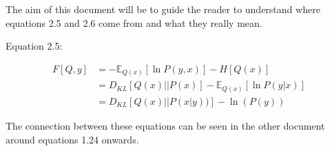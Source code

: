 \documentclass[11pt,oneside]{memoir}
\begin{document}
The aim of this document will be to guide the reader to understand where equations 2.5 and 2.6 come from and what they really mean.

Equation 2.5:

\begin{align}
    F[Q,y]&=-\mathbb{E}_{Q(x)}\left[\ln P(y,x)\right]-H[Q(x)]\\&=D_{KL}[Q(x)||P(x)]-\mathbb{E}_{Q(x)}[\ln P(y|x)]\\&=D_{KL}[Q(x)||P(x|y))]-\ln(P(y))
\end{align}

The connection between these equations can be seen in the other document around equations 1.24 onwards.
\end{document}
